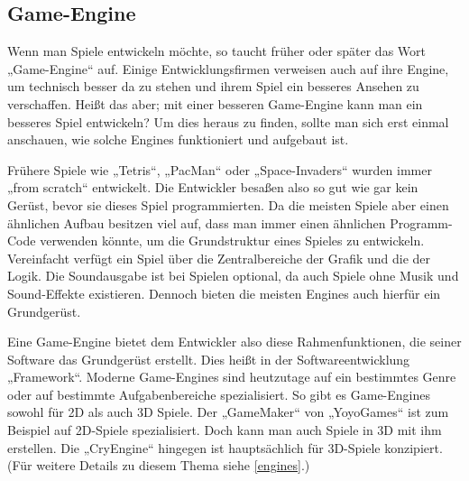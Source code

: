 \subsection{Game-Engine}	
\label{engine}
Wenn man Spiele entwickeln möchte, so taucht früher oder später das Wort „Game-Engine“ auf. Einige Entwicklungsfirmen verweisen auch auf ihre Engine, um technisch besser da zu stehen und ihrem Spiel ein besseres Ansehen zu verschaffen. Heißt das aber; mit einer besseren Game-Engine kann man ein besseres Spiel entwickeln? Um dies heraus zu finden, sollte man sich erst einmal anschauen, wie solche Engines funktioniert und aufgebaut ist.

Frühere Spiele wie „Tetris“, „PacMan“ oder „Space-Invaders“ wurden immer „from scratch“  entwickelt. Die Entwickler besaßen also so gut wie gar kein Gerüst, bevor sie dieses Spiel programmierten. Da die meisten Spiele aber einen ähnlichen Aufbau besitzen viel auf, dass man immer einen ähnlichen Programm-Code verwenden könnte, um die Grundstruktur eines Spieles zu entwickeln. Vereinfacht verfügt ein Spiel über die Zentralbereiche der Grafik und die der Logik. Die Soundausgabe ist bei Spielen optional, da auch Spiele ohne Musik und Sound-Effekte existieren. Dennoch bieten die meisten Engines auch hierfür ein Grundgerüst.

Eine Game-Engine bietet dem Entwickler also diese Rahmenfunktionen, die seiner Software das Grundgerüst erstellt. Dies heißt in der Softwareentwicklung „Framework“. 
Moderne Game-Engines sind heutzutage auf ein bestimmtes Genre oder auf bestimmte Aufgabenbereiche spezialisiert. So gibt es Game-Engines sowohl für 2D als auch 3D Spiele. Der „GameMaker“ von „YoyoGames“ ist zum Beispiel auf 2D-Spiele spezialisiert. Doch kann man auch Spiele in 3D mit ihm erstellen. Die „CryEngine“ hingegen ist hauptsächlich für 3D-Spiele konzipiert. (Für weitere Details zu diesem Thema siehe \ref{engines}.)

